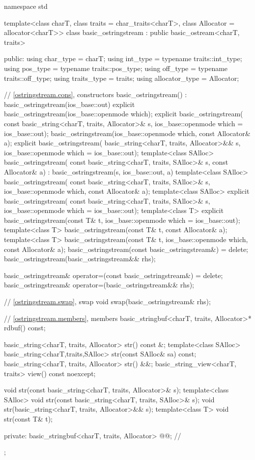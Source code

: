 %
\begin{codeblock}
namespace std {
  template<class charT, class traits = char_traits<charT>, class Allocator = allocator<charT>>
  class basic_ostringstream : public basic_ostream<charT, traits> {
  public:
    using char_type      = charT;
    using int_type       = typename traits::int_type;
    using pos_type       = typename traits::pos_type;
    using off_type       = typename traits::off_type;
    using traits_type    = traits;
    using allocator_type = Allocator;

    // \ref{ostringstream.cons}, constructors
    basic_ostringstream() : basic_ostringstream(ios_base::out) {}
    explicit basic_ostringstream(ios_base::openmode which);
    explicit basic_ostringstream(
      const basic_string<charT, traits, Allocator>& s,
      ios_base::openmode which = ios_base::out);
    basic_ostringstream(ios_base::openmode which, const Allocator& a);
    explicit basic_ostringstream(
      basic_string<charT, traits, Allocator>&& s,
      ios_base::openmode which = ios_base::out);
    template<class SAlloc>
      basic_ostringstream(
        const basic_string<charT, traits, SAlloc>& s, const Allocator& a)
        : basic_ostringstream(s, ios_base::out, a) {}
    template<class SAlloc>
      basic_ostringstream(
        const basic_string<charT, traits, SAlloc>& s,
        ios_base::openmode which, const Allocator& a);
    template<class SAlloc>
      explicit basic_ostringstream(
        const basic_string<charT, traits, SAlloc>& s,
        ios_base::openmode which = ios_base::out);
    template<class T>
      explicit basic_ostringstream(const T& t, ios_base::openmode which = ios_base::out);
    template<class T>
      basic_ostringstream(const T& t, const Allocator& a);
    template<class T>
      basic_ostringstream(const T& t, ios_base::openmode which, const Allocator& a);
    basic_ostringstream(const basic_ostringstream&) = delete;
    basic_ostringstream(basic_ostringstream&& rhs);

    basic_ostringstream& operator=(const basic_ostringstream&) = delete;
    basic_ostringstream& operator=(basic_ostringstream&& rhs);

    // \ref{ostringstream.swap}, swap
    void swap(basic_ostringstream& rhs);

    // \ref{ostringstream.members}, members
    basic_stringbuf<charT, traits, Allocator>* rdbuf() const;

    basic_string<charT, traits, Allocator> str() const &;
    template<class SAlloc>
      basic_string<charT,traits,SAlloc> str(const SAlloc& sa) const;
    basic_string<charT, traits, Allocator> str() &&;
    basic_string_view<charT, traits> view() const noexcept;

    void str(const basic_string<charT, traits, Allocator>& s);
    template<class SAlloc>
      void str(const basic_string<charT, traits, SAlloc>& s);
    void str(basic_string<charT, traits, Allocator>&& s);
    template<class T>
      void str(const T& t);

   private:
    basic_stringbuf<charT, traits, Allocator> @@;   // \expos
  };
}
\end{codeblock}

